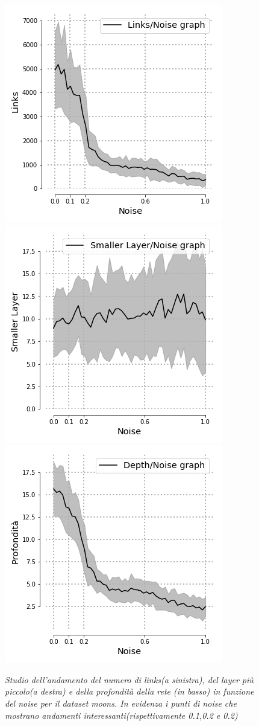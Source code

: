 \documentclass[12pt,a4paper]{report}
\begin{document}
\begin{figure}[H]
 \centering
 \includegraphics[scale = 0.5]{images/links_noise_moons}
 \includegraphics[scale = 0.5]{images/small_noise_moons}
 \includegraphics[scale = 0.5]{images/depth_noise_moons}
 \caption{\textit{Studio dell'andamento del numero di links(a sinistra), del layer più piccolo(a destra) e della profondità della rete (in basso) in funzione del noise per il dataset moons. In evidenza i punti di noise che mostrano andamenti interessanti(rispettivamente 0.1,0.2 e 0.2)}}
 \label{noisemoons}
\end{figure}
\end{document}
